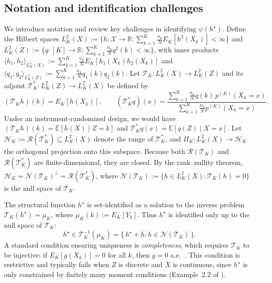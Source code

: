 \documentclass[11pt]{article}
\theoremstyle{plain}
\theoremstyle{definition}
\theoremstyle{remark}
\theoremstyle{definition}
\begin{document}
 

\subsection{Notation and identification challenges}

 We introduce notation and review key challenges in identifying \(\psi(h^\star)\). Define the Hilbert spaces
\( L^2_K(X) := \{ h : \mathcal{X} \to \mathbb{R} : \sum_{k=1}^K \tfrac{n_k}{N} E_K[h^2(X_k)] < \infty \} \)
and
\( L^2_K(Z) := \{ q : [K] \to \mathbb{R} : \sum_{k=1}^K \tfrac{n_k}{N} q^2(k) < \infty \} \),
with inner products
\(\langle h_1, h_2 \rangle_{L^2_K(X)} := \sum_{k=1}^K \tfrac{n_k}{N} E_K[h_1(X_k)h_2(X_k)]\)
and
\(\langle q_1, q_2 \rangle_{L^2_K(Z)} := \sum_{k=1}^K \tfrac{n_k}{N} q_1(k)q_2(k)\). Let \(\mathcal{T}_K : L^2_K(X) \to L^2_K(Z)\) and its adjoint 
\(\mathcal{T}_K^* : L^2_K(Z) \to L^2_K(X)\) be defined by
\[
(\mathcal{T}_K h)(k) = E_K[h(X_k)], \qquad
(\mathcal{T}_K^* q)(x)
  = \frac{\sum_{k=1}^K \frac{n_k}{N} q(k)\, p^{(K)}(X_k = x)}
         {\sum_{k=1}^K \frac{n_k}{N} p^{(K)}(X_k = x)}.
\]
Under an instrument-randomized design, we would have $(\mathcal{T}_K h)(k) = \mathbb{E}[h(X) \mid Z = k]$ and \(\mathcal{T}_K^* q(x) = \mathbb{E}[q(Z) \mid X = x]\). Let \(\mathcal{H}_K := \mathcal{R}(\mathcal{T}_K^*) \subseteq L^2_K(X)\) denote the range of \(\mathcal{T}_K^*\),
and \(\Pi_K : L^2_K(X) \to \mathcal{H}_K\) the orthogonal projection onto this subspace. Because both \(\mathcal{R}(\mathcal{T}_K)\) and \(\mathcal{R}(\mathcal{T}_K^*)\) are finite-dimensional, they are closed.
By the rank--nullity theorem,
\(\mathcal{H}_K = \mathcal{N}(\mathcal{T}_K)^\perp = \mathcal{R}(\mathcal{T}_K^*)\),
where \(\mathcal{N}(\mathcal{T}_K) := \{ h \in L^2_K(X) : \mathcal{T}_K(h) = 0 \}\) is the null space of \(\mathcal{T}_K\).

 
The structural function \(h^\star\) is set-identified as a solution to the
inverse problem \(\mathcal{T}_K(h^\star) = \mu_K\), where
\(\mu_K(k) := E_K[Y_k]\). Thus \(h^\star\) is identified only up to the null
space of \(\mathcal{T}_K\):
\[
h^\star \in \mathcal{T}_K^{-1}(\mu_K)
= \{\, h^\star + h : h \in \mathcal{N}(\mathcal{T}_K) \,\}.
\]
A standard condition ensuring uniqueness is \emph{completeness}, which requires
\(\mathcal{T}_K\) to be injective: if \(E_K[g(X_k)] = 0\) for all \(k\), then
\(g = 0\) a.e.\ \citep{newey2003instrumental, blundell2007semi,
carrasco2007linear, newey2013nonparametric}. This condition is restrictive and
typically fails when \(Z\) is discrete and \(X\) is continuous, since $h^\star$ is only constrained by
finitely many moment conditions (Example~2.2 of
\citealp{babii2020completeness}).
\end{document}
